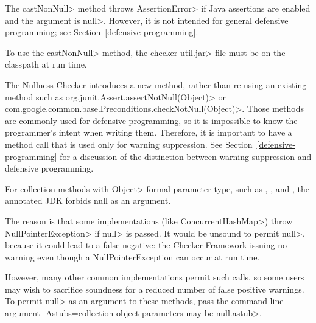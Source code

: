   The \<castNonNull> method throws \<AssertionError> if Java assertions are enabled and
  the argument is \<null>.  However, it is not intended for general defensive
  programming; see Section~\ref{defensive-programming}.

  To use the \<castNonNull> method, the \<checker-util.jar> file
  must be on the classpath at run time.

\begin{sloppypar}
The Nullness Checker introduces a new method, rather than re-using an
existing method such as \<org.junit.Assert.assertNotNull(Object)> or
\<com.google.common.base.Preconditions.checkNotNull(Object)>.  Those
methods are commonly used for defensive programming, so it is impossible to
know the programmer's intent when writing them.  Therefore, it is important to
have a method call that is used only for warning suppression.  See
Section~\ref{defensive-programming} for a discussion of
the distinction between warning suppression and defensive programming.
\end{sloppypar}



For collection methods with \<Object> formal parameter type, such as
,
, and
,
the annotated JDK forbids null as an argument.

The reason is that some implementations (like \<ConcurrentHashMap>) throw
\<NullPointerException> if \<null> is passed.  It would be unsound to
permit \<null>, because it could lead to a false negative:  the Checker
Framework issuing no warning even though a NullPointerException can occur
at run time.

However, many other common implementations permit such calls, so some users
may wish to sacrifice soundness for a reduced number of false positive
warnings.  To permit \<null> as an argument to these methods, pass the
command-line argument
\<-Astubs=collection-object-parameters-may-be-null.astub>.



